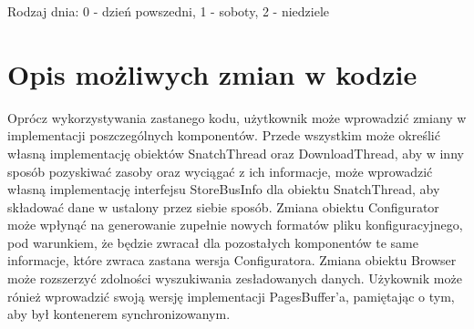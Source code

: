 \documentclass{article}
\begin{document}
Rodzaj dnia: 0 - dzień powszedni, 1 - soboty, 2 - niedziele

\section{Opis możliwych zmian w kodzie}
Oprócz wykorzystywania zastanego kodu, użytkownik może wprowadzić zmiany w implementacji poszczególnych komponentów. Przede wszystkim może określić własną implementację obiektów SnatchThread oraz DownloadThread, aby w inny sposób pozyskiwać zasoby oraz wyciągać z ich informacje, może wprowadzić własną implementację interfejsu StoreBusInfo dla obiektu SnatchThread, aby składować dane w ustalony przez siebie sposób. Zmiana obiektu Configurator może wpłynąć na generowanie zupełnie nowych formatów pliku konfiguracyjnego, pod warunkiem, że będzie zwracał dla pozostałych komponentów te same informacje, które zwraca zastana wersja Configuratora. Zmiana obiektu Browser może rozszerzyć zdolności wyszukiwania zesładowanych danych. Użykownik może rónież wprowadzić swoją wersję implementacji PagesBuffer'a, pamiętając o tym, aby był kontenerem synchronizowanym.
\end{document}
